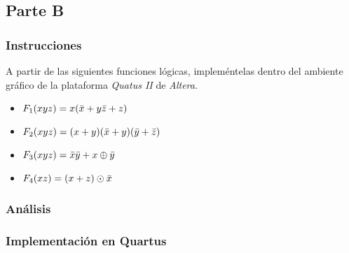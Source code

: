 \documentclass[../procedimientos.tex]{subfiles}
\begin{document}
\clearpage
\subsection{Parte B}
\subsubsection{Instrucciones}
A partir de las siguientes funciones lógicas, impleméntelas dentro del 
ambiente gráfico de la plataforma \textit{Quatus II} de \textit{Altera}.
\begin{itemize}
  \item $F_1 (xyz) = x (\bar{x} + y\bar{z} + z)$
  \item $F_2 (xyz) = (x + y) (\bar{x} + y) (\bar{y} + \bar{z})$
  \item $F_3 (xyz) = \bar{x}\bar{y} + x\oplus\bar{y}$
  \item $F_4 (xz)  = (x + z)\odot\bar{x}$
\end{itemize}

\subsubsection{Análisis}

\subsubsection{Implementación en Quartus}
\end{document}
